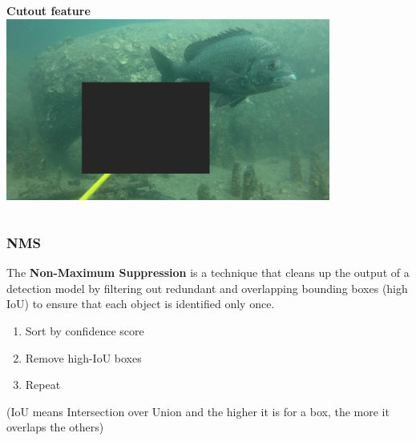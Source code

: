 \documentclass[serif]{beamer}  %
\begin{document}
\begin{frame}
\begin{columns}
\begin{column}{0.5\textwidth}
	\centering
	\textbf{Cutout feature}
	\includegraphics[width=0.8\textwidth]{images/cutout.jpg}
\end{column}
\end{columns}

\end{frame}

\begin{frame}
\frametitle{NMS}
The \textbf{Non-Maximum Suppression} is a technique that cleans up the output of a detection model by filtering out redundant and overlapping bounding boxes (high IoU) to ensure that each object is identified only once. 
\begin{enumerate}
	\item Sort by confidence score
	\item Remove high-IoU boxes 
	\item Repeat
\end{enumerate}
(IoU means Intersection over Union and the higher it is for a box, the more it overlaps the others)
\end{frame}
\end{document}
